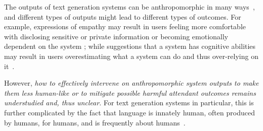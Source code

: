 \documentclass[11pt]{article}
\begin{document}
The outputs of text generation systems can be anthropomorphic in many ways~\cite{abercrombie-etal-2023-mirages,devrio2025taxonomy}, and different types of outputs might lead to different types of outcomes.  
For example, expressions of empathy may result in users feeling more comfortable with disclosing sensitive or private information \cite[e.g.,][]{Ischen2020-it} or becoming emotionally dependent on the system \cite[e.g.,][]{Laestadius2022-ki}; while suggestions that a system has cognitive abilities may result in users overestimating what a system can do \cite{ibrahim2024characterizing} and thus over-relying on it~\cite{passi2022overreliance}. 


However, {\em how to effectively intervene on anthropomorphic system outputs to make them less human-like or to mitigate possible harmful attendant outcomes remains understudied and, thus unclear}. For text generation systems in particular, this is further complicated by the fact that language is innately human, often produced by humans, for humans, and is frequently about humans~\cite{devrio2025taxonomy,lucy-etal-2024-one}.
\end{document}
